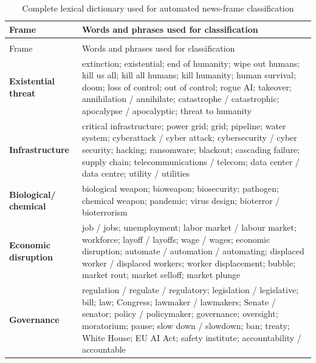 \elsevierclasstrue\documentclass[preprint,12pt]{elsarticle}%
\begin{document}
\scriptsize
\begin{center}

\begin{longtable}{
>{\raggedright\arraybackslash}p{}
>{\raggedright\arraybackslash}p{}}

\caption{\scriptsize Complete lexical dictionary used for automated news-frame classification}
\label{tab:framedictionary}\\

\toprule
Frame & Words and phrases used for classification \\
\midrule
\endfirsthead

\multicolumn{2}{c}{\scriptsize\textit{Table \thetable\ continued}}\\
\toprule
Frame & Words and phrases used for classification \\
\midrule
\endhead

\bottomrule
\endfoot

\textbf{Existential threat} &
extinction;
existential;
end of humanity;
wipe out humans;
kill us all;
kill all humans;
kill humanity;
human survival;
doom;
loss of control;
out of control;
rogue AI;
takeover;
annihilation / annihilate;
catastrophe / catastrophic;
apocalypse / apocalyptic;
threat to humanity
\\[0.5em]

\textbf{Infrastructure} &
critical infrastructure;
power grid;
grid;
pipeline;
water system;
cyberattack / cyber attack;
cybersecurity / cyber security;
hacking;
ransomware;
blackout;
cascading failure;
supply chain;
telecommunications / telecom;
data center / data centre;
utility / utilities
\\[0.5em]

\textbf{Biological/ chemical} &
biological weapon;
bioweapon;
biosecurity;
pathogen;
chemical weapon;
pandemic;
virus design;
bioterror / bioterrorism
\\[0.5em]

\textbf{Economic disruption} &
job / jobs;
unemployment;
labor market / labour market;
workforce;
layoff / layoffs;
wage / wages;
economic disruption;
automate / automation / automating;
displaced worker / displaced workers;
worker displacement;
bubble;
market rout;
market selloff;
market plunge
\\[0.5em]

\textbf{Governance} &
regulation / regulate / regulatory;
legislation / legislative;
bill;
law;
Congress;
lawmaker / lawmakers;
Senate / senator;
policy / policymaker;
governance;
oversight;
moratorium;
pause;
slow down / slowdown;
ban;
treaty;
White House;
EU AI Act;
safety institute;
accountability / accountable
\\[0.5em]


\end{longtable}
\end{center}
\end{document}
